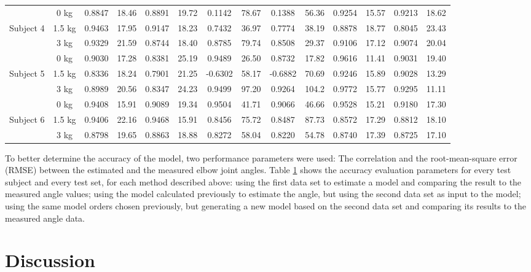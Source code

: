 \documentclass[letterpaper, 10 pt, conference]{ieeeconf}  %
\begin{document}
\begin{table}[t]
{\begin{tabular}{|c c|c c|c c|c c|c c|c c|c c|}
& 0 kg &0.8847 &18.46 &0.8891 &19.72 & 0.1142 & 78.67 & 0.1388 & 56.36 &0.9254 &15.57 &0.9213 &18.62\\
Subject 4 & 1.5 kg &0.9463 &17.95 &0.9147 &18.23 & 0.7432 & 36.97 & 0.7774 & 38.19 &0.8878 &18.77 &0.8045 &23.43\\
& 3 kg &0.9329 &21.59 &0.8744 &18.40 & 0.8785 & 79.74 & 0.8508 & 29.37 &0.9106 &17.12 &0.9074 &20.04\\
\hline

& 0 kg &0.9030 &17.28 &0.8381 &25.19 & 0.9489 & 26.50 & 0.8732 & 17.82 &0.9616 &11.41 &0.9031 &19.40 \\
Subject 5 & 1.5 kg &0.8336 &18.24 &0.7901 &21.25 & -0.6302 & 58.17 & -0.6882 & 70.69 &0.9246 &15.89 &0.9028 &13.29\\
& 3 kg & 0.8989 &20.56 &0.8347 &24.23& 0.9499 & 97.20 & 0.9264 & 104.2 &0.9772 &15.77 &0.9295 &11.11\\
\hline

& 0 kg &0.9408 &15.91 &0.9089 &19.34 & 0.9504 & 41.71 & 0.9066 & 46.66 &0.9528 &15.21 &0.9180 &17.30\\
Subject 6 & 1.5 kg &0.9406 &22.16 &0.9468 &15.91 & 0.8456 & 75.72 & 0.8487 & 87.73 &0.8572 &17.29 &0.8812 &18.10 \\
& 3 kg & 0.8798 & 19.65 &0.8863 &18.88 & 0.8272 & 58.04 & 0.8220 & 54.78 &0.8740 &17.39 &0.8725 &17.10\\
\hline


\end{tabular}%
}
\label{ta:corr}
\end{table}

To better determine the accuracy of the model, two performance parameters were used: The correlation and the root-mean-square error (RMSE) between the estimated and the measured elbow joint angles. Table \ref{ta:corr} shows the accuracy evaluation parameters for every test subject and every test set, for each method described above: using the first data set to estimate a model and comparing the result to the measured angle values; using the model calculated previously to estimate the angle, but using the second data set as input to the model; using the same model orders chosen previously, but generating a new model based on the second data set and comparing its results to the measured angle data.


\section{Discussion}
\end{document}

